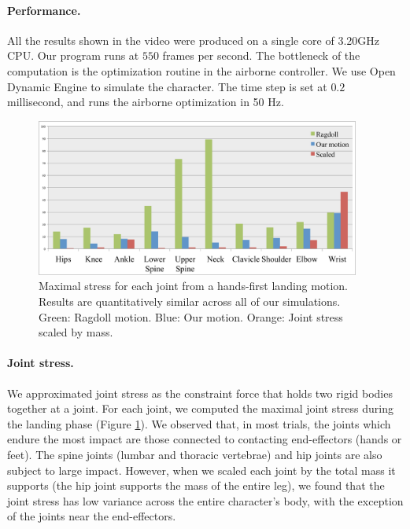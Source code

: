 \paragraph{Performance.}
All the results shown in the video were produced on a single core of
3.20GHz CPU. Our program runs at $550$ frames per second. The
bottleneck of the computation is the optimization routine in the
airborne controller. We use Open Dynamic Engine to simulate the
character. The time step is set at $0.2$ millisecond, and runs
the airborne optimization in 50 Hz.
\begin{figure}[ht]
\center
  \includegraphics[width=4.2in]{images/stress}
  \caption{
    Maximal stress for each joint from a hands-first landing
    motion. Results are quantitatively similar across all of our
    simulations. Green: Ragdoll motion. Blue: Our motion. Orange: Joint
    stress scaled by mass.}
 \label{fig:landing_jointStress}
\end{figure}
\paragraph{Joint stress.}
We approximated joint stress as the constraint force that holds two
rigid bodies together at a joint. For each joint, we computed the
maximal joint stress during the landing phase (Figure
\ref{fig:landing_jointStress}). We observed that, in most trials, the joints
which endure the most impact are those connected to contacting
end-effectors (\ie hands or feet). The spine joints (lumbar and
thoracic vertebrae) and hip joints are also subject to large
impact. However, when we scaled each joint by the total mass it
supports (\eg the hip joint supports the mass of the entire leg), we
found that the joint stress has low variance across the entire
character's body, with the exception of the joints near the
end-effectors.

